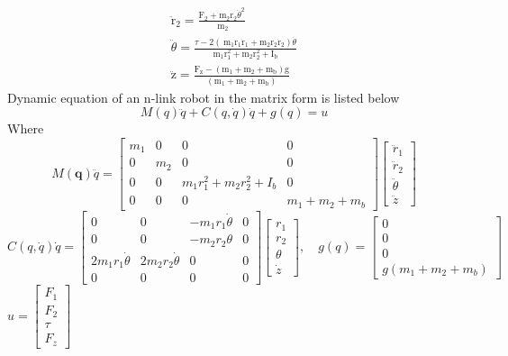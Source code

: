 \documentclass{UoNMCHA}
\numberwithin{equation}{section}
\begin{document}
	$$
	\begin{array}{c}
	\ddot{\mathrm{r}}_{2}=\frac{\mathrm{F}_{2}+\mathrm{m}_{2} \mathrm{r}_{2} \dot{\theta}^{2}}{\mathrm{~m}_{2}} \\
	\ddot{\theta}=\frac{\tau-2\left(\mathrm{~m}_{1} \mathrm{r}_{1} \dot{\mathrm{r}}_{1}+\mathrm{m}_{2} \mathrm{r}_{2} \dot{\mathrm{r}}_{2}\right) \dot{\theta}}{\mathrm{m}_{1} \mathrm{r}_{1}^{2}+\mathrm{m}_{2} \mathrm{r}_{2}^{2}+\mathrm{I}_{\mathrm{b}}} \\
	\ddot{\mathrm{z}}=\frac{\mathrm{F}_{\mathrm{z}}-\left(\mathrm{m}_{1}+\mathrm{m}_{2}+\mathrm{m}_{\mathrm{b}}\right) \mathrm{g}}{\left(\mathrm{m}_{1}+\mathrm{m}_{2}+\mathrm{m}_{\mathrm{b}}\right)}
	\end{array}
	$$
	Dynamic equation of an n-link robot in the matrix form is listed below
	$$
	M(q) \ddot{q}+C(q, \dot{q}) \dot{q}+g(q)=u
	$$
	Where
	$$
	M(\boldsymbol{q}) \ddot{q}=\left[\begin{array}{cccc}
	m_{1} & 0 & 0 & 0 \\
	0 & m_{2} & 0 & 0 \\
	0 & 0 & m_{1} r_{1}^{2}+m_{2} r_{2}^{2}+I_{b} & 0 \\
	0 & 0 & 0 & m_{1}+m_{2}+m_{b}
	\end{array}\right]\left[\begin{array}{c}
	\ddot{r}_{1} \\
	\ddot{r}_{2} \\
	\ddot{\theta} \\
	\ddot{z}
	\end{array}\right]
	$$
	$C(q, \dot{q}) \dot{q}=\left[\begin{array}{cccc}0 & 0 & -m_{1} r_{1} \dot{\theta} & 0 \\ 0 & 0 & -m_{2} r_{2} \theta & 0 \\ 2 m_{1} r_{1} \dot{\theta} & 2 m_{2} r_{2} \dot{\theta} & 0 & 0 \\ 0 & 0 & 0 & 0\end{array}\right]\left[\begin{array}{c}r_{1} \\ r_{2} \\ \theta \\ \dot{z}\end{array}\right], \quad g(q)=\left[\begin{array}{c}0 \\ 0 \\ 0 \\ g\left(m_{1}+m_{2}+m_{b}\right)\end{array}\right]$
	$u=\left[\begin{array}{c}F_{1} \\ F_{2} \\ \tau \\ F_{z}\end{array}\right]$
	
\end{document}
